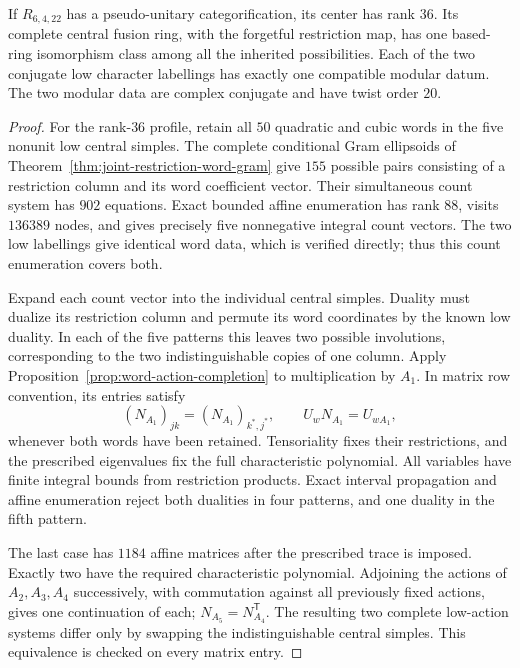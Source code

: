 \begin{theorem}
\label{thm:22-central-completion}
If $R_{6,4,22}$ has a pseudo-unitary categorification, its center has rank
$36$. Its complete central fusion ring, with the forgetful restriction
map, has one based-ring isomorphism class among all the inherited
possibilities. Each of the two conjugate low character labellings has
exactly one compatible modular datum. The two modular data are complex
conjugate and have twist order $20$.
\end{theorem}
\begin{proof}
For the rank-$36$ profile, retain all $50$ quadratic and cubic words in
the five nonunit low central simples. The complete conditional Gram
ellipsoids of Theorem~\ref{thm:joint-restriction-word-gram} give $155$
possible pairs consisting of a restriction column and its word
coefficient vector. Their simultaneous count system has $902$ equations.
Exact bounded affine enumeration has rank $88$, visits $136389$ nodes,
and gives precisely five nonnegative integral count vectors. The two
low labellings give identical word data, which is verified directly;
thus this count enumeration covers both.

Expand each count vector into the individual central simples. Duality
must dualize its restriction column and permute its word coordinates by
the known low duality. In each of the five patterns this leaves two
possible involutions, corresponding to the two indistinguishable copies
of one column. Apply Proposition~\ref{prop:word-action-completion} to
multiplication by $A_1$. In matrix row convention, its entries satisfy
\[
 (N_{A_1})_{jk}=(N_{A_1})_{k^*,j^*},\qquad
 U_wN_{A_1}=U_{wA_1},
\]
whenever both words have been retained. Tensoriality fixes their
restrictions, and the prescribed eigenvalues fix the full characteristic
polynomial. All variables have finite integral bounds from restriction
products. Exact interval propagation and affine enumeration reject both
dualities in four patterns, and one duality in the fifth pattern.

The last case has $1184$ affine matrices after the prescribed trace is
imposed. Exactly two have the required characteristic polynomial.
Adjoining the actions of $A_2,A_3,A_4$ successively, with commutation
against all previously fixed actions, gives one continuation of each;
$N_{A_5}=N_{A_4}^{\mathsf T}$. The resulting two complete low-action
systems differ only by swapping the indistinguishable central simples.
This equivalence is checked on every matrix entry.


\end{proof}
